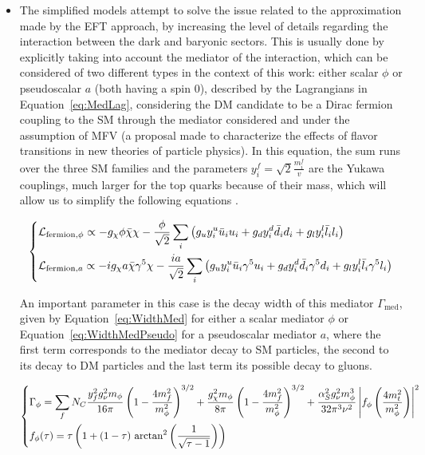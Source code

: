 \documentclass[a4paper, 10pt, openright]{report}
\begin{document}
\begin{itemize}
\item The simplified models attempt to solve the issue related to the approximation made by the \ac{EFT} approach, by increasing the level of details regarding the interaction between the dark and baryonic sectors. This is usually done by explicitly taking into account the mediator of the interaction, which can be considered of two different types in the context of this work: either scalar $\phi$ or pseudoscalar $a$ (both having a spin 0), described by the Lagrangians in Equation~\ref{eq:MedLag}, considering the \ac{DM} candidate to be a Dirac fermion coupling to the \ac{SM} through the mediator considered and under the assumption of \acf{MFV} (a proposal made to characterize the effects of flavor transitions in new theories of particle physics). In this equation, the sum runs over the three \ac{SM} families and the parameters $y_i^f = \sqrt{2} \frac{m_i^f}{v}$ are the Yukawa couplings, much larger for the top quarks because of their mass, which will allow us to simplify the following equations \cite{SimplifiedModels}.

\begin{equation}
\label{eq:MedLag}
\begin{dcases}
\mathcal{L}_{\text{fermion}, \phi} \propto - g_\chi \phi \bar \chi \chi - \frac{\phi}{\sqrt{2}} \sum_i \left (g_u y_i^u \bar u_i u_i + g_d y_i^d \bar d_i d_i + g_l y_i^l \bar l_i l_i \right ) \\
\mathcal{L}_{\text{fermion}, a} \propto - i g_\chi a \bar \chi \gamma^5 \chi - \frac{i a}{\sqrt{2}} \sum_i \left (g_u y_i^u \bar u_i \gamma^5 u_i + g_d y_i^d \bar d_i \gamma^5 d_i + g_l y_i^l \bar l_i \gamma^5 l_i \right )
\end{dcases}
\end{equation}

An important parameter in this case is the decay width of this mediator $\Gamma_{\text{med}}$, given by Equation~\ref{eq:WidthMed} for either a scalar mediator $\phi$ or Equation~\ref{eq:WidthMedPseudo} for a pseudoscalar mediator $a$, where the first term corresponds to the mediator decay to \ac{SM} particles, the second to its decay to \ac{DM} particles and the last term its possible decay to gluons. 

\begin{equation}
\label{eq:WidthMed}
\begin{dcases}
\Gamma_{\phi} = \sum_f N_C \frac{y_f^2 g_\nu^2 m_\phi}{16 \pi} \left (1- \frac{4 m_f^2}{m_\phi^2} \right )^{3/2} + \frac{g_\chi^2 m_\phi}{8 \pi} \left (1- \frac{4 m_f^2}{m_\phi^2} \right )^{3/2} + \frac{\alpha_S^2 g_\nu^2 m_\phi^3}{32 \pi^3 \nu^2} \left \lvert f_\phi \left (\frac{4m_t^2}{m_\phi^2} \right ) \right \rvert^2 \\
f_\phi(\tau) = \tau \left (1 + (1 - \tau) \text{ arctan}^2 \left ( \frac{1}{\sqrt{\tau -1}} \right ) \right )
\end{dcases}
\end{equation}


\end{itemize}
\end{document}
